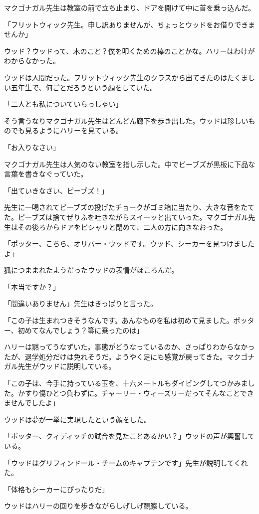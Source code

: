 \documentclass[10pt,a4paper]{article}
\begin{document}
\begin{CJK}{UTF8}{min}
マクゴナガル先生は教室の前で立ち止まり、ドアを開けて中に首を乗っ込んだ。

「フリットウィック先生。申し訳ありませんが、ちょっとウッドをお借りできませんか」

ウッド？ウッドって、木のこと？僕を叩くための棒のことかな。ハリーはわけがわからなかった。

ウッドは人間だった。フリットウィック先生のクラスから出てきたのはたくましい五年生で、何ごとだろうという顔をしていた。

「二人とも私についていらっしゃい」

そう言うなりマクゴナガル先生はどんどん廊下を歩き出した。ウッドは珍しいものでも見るようにハリーを見ている。

「お入りなさい」

マクゴナガル先生は人気のない教室を指し示した。中でピーブズが黒板に下品な言葉を書きなぐっていた。

「出ていきなさい、ピーブズ！」

先生に一喝されてピーブズの投げたチョークがゴミ箱に当たり、大きな音をたてた。ピーブズは捨てぜりふを吐きながらスイーッと出ていった。マクゴナガル先生はその後ろからドアをピシャリと閉めて、二人の方に向きなおった。

「ポッター、こちら、オリバー・ウッドです。ウッド、シーカーを見つけましたよ」

狐につままれたようだったウッドの表情がほころんだ。

「本当ですか？」

「間違いありません」先生はきっぱりと言った。

「この子は生まれつきそうなんです。あんなものを私は初めて見ました。ポッター、初めてなんでしょう？箒に乗ったのは」

ハリーは黙ってうなずいた。事態がどうなっているのか、さっぱりわからなかったが、退学処分だけは免れそうだ。ようやく足にも感覚が戻ってきた。マクゴナガル先生がウッドに説明している。

「この子は、今手に持っている玉を、十六メートルもダイビングしてつかみました。かすり傷ひとつ負わずに。チャーリー・ウィーズリーだってそんなことできませんでしたよ」

ウッドは夢が一挙に実現したという顔をした。

「ポッター、クィディッチの試合を見たことあるかい？」ウッドの声が興奮している。

「ウッドはグリフィンドール・チームのキャプテンです」先生が説明してくれた。

「体格もシーカーにぴったりだ」

ウッドはハリーの回りを歩きながらしげしげ観察している。


\end{CJK}
\end{document}
